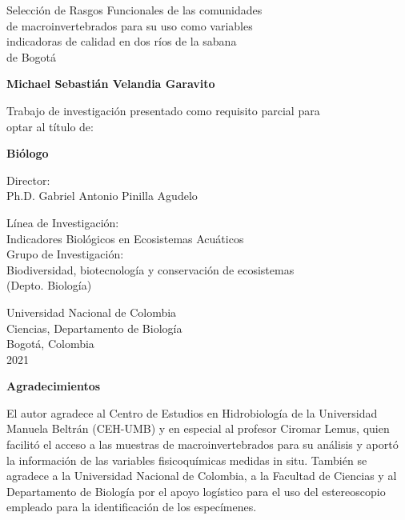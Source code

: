 	\begin{center}
	\vspace{0.8cm}
	\LARGE
	Selección de Rasgos Funcionales de las comunidades \\
	de macroinvertebrados para su uso como variables \\
	indicadoras de  calidad en dos ríos de la sabana \\
	de Bogotá
	
	\vspace{0.8cm}
	\Large
	\textbf{Michael Sebastián Velandia Garavito}
	
	\vspace{2.7cm}	
    \normalsize
	Trabajo de investigación presentado como requisito parcial para \\
	optar al título de: 
	
	\vspace{0.2cm}
	\normalsize
	\textbf{Biólogo}
    
	\vspace{1cm}
	\normalsize
	Director:\\
    Ph.D. Gabriel Antonio Pinilla Agudelo

	\vspace{1.3cm}
	\normalsize
	Línea de Investigación:\\
    Indicadores Biológicos en Ecosistemas Acuáticos\\
    Grupo de Investigación:\\
    Biodiversidad, biotecnología y conservación de ecosistemas\\ 
    (Depto. Biología)


	\vspace{1.3cm}
	\normalsize
	Universidad Nacional de Colombia\\
    Ciencias, Departamento de Biología\\
    Bogotá, Colombia\\
    2021\\

	\vspace{1.5cm}
	\end{center}

\newpage
\thispagestyle{empty}
    
    \begin{center}
    
    \vspace{0.8cm}
	\Large
	\textbf{Agradecimientos}
	
	\vspace{0.8cm}
	\normalsize
    El autor agradece al Centro de Estudios en Hidrobiología de la Universidad Manuela 
    Beltrán (CEH-UMB) y en especial al profesor Ciromar Lemus, quien facilitó el acceso
    a las muestras de macroinvertebrados para su análisis y aportó la información de 
    las variables fisicoquímicas medidas in situ. También se agradece a la Universidad
    Nacional de Colombia, a la Facultad de Ciencias y al Departamento de Biología 
    por el apoyo logístico para el uso del estereoscopio empleado para la identificación 
    de los especímenes.
        
    \vspace{0.8cm}     
	\end{center}
	
\newpage
